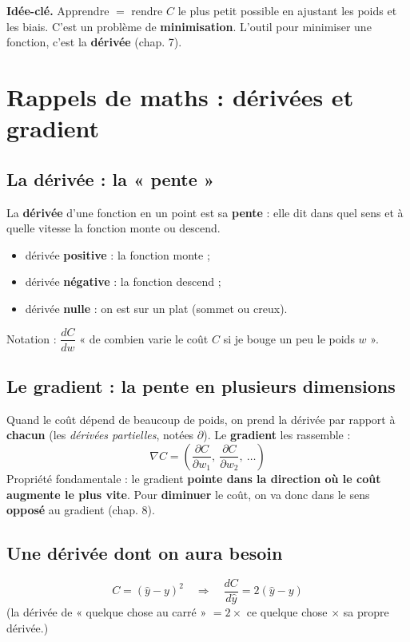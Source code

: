 \documentclass[11pt]{article}
\begin{document}
\begin{retenir}
\textbf{Idée-clé.} Apprendre $=$ rendre $C$ le plus petit possible en ajustant les
poids et les biais. C'est un problème de \textbf{minimisation}. L'outil pour
minimiser une fonction, c'est la \textbf{dérivée} (chap. 7).
\end{retenir}

\section{Rappels de maths : dérivées et gradient}

\subsection{La dérivée : la « pente »}
La \textbf{dérivée} d'une fonction en un point est sa \textbf{pente} : elle dit
dans quel sens et à quelle vitesse la fonction monte ou descend.
\begin{itemize}[leftmargin=2em]
  \item dérivée \textbf{positive} : la fonction monte ;
  \item dérivée \textbf{négative} : la fonction descend ;
  \item dérivée \textbf{nulle} : on est sur un plat (sommet ou creux).
\end{itemize}
Notation : $\dfrac{dC}{dw}$ « de combien varie le coût $C$ si je bouge un peu le
poids $w$ ».

\subsection{Le gradient : la pente en plusieurs dimensions}
Quand le coût dépend de beaucoup de poids, on prend la dérivée par rapport à
\textbf{chacun} (les \emph{dérivées partielles}, notées $\partial$). Le
\textbf{gradient} les rassemble :
\[
\nabla C = \left( \frac{\partial C}{\partial w_1},\ \frac{\partial C}{\partial w_2},\ \dots \right)
\]
Propriété fondamentale : le gradient \textbf{pointe dans la direction où le coût
augmente le plus vite}. Pour \textbf{diminuer} le coût, on va donc dans le sens
\textbf{opposé} au gradient (chap. 8).

\subsection{Une dérivée dont on aura besoin}
\[
C = (\hat{y}-y)^2 \quad\Longrightarrow\quad \frac{dC}{d\hat{y}} = 2(\hat{y} - y)
\]
(la dérivée de « quelque chose au carré » $= 2 \times$ ce quelque chose $\times$ sa
propre dérivée.)
\end{document}
